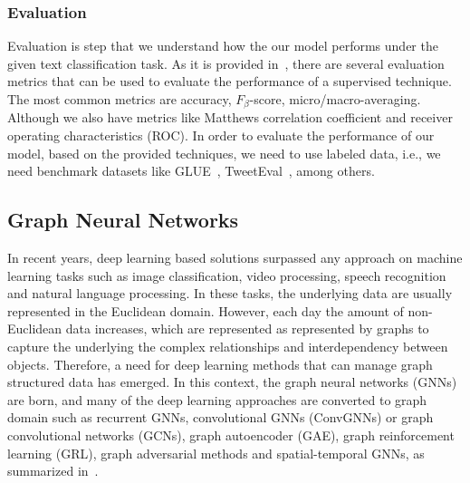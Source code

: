 \subsubsection{Evaluation}
Evaluation is step that we understand how the our model performs under the given text classification task. As it is provided in~\autocite{li20tc,minaee20tc}, there are several evaluation metrics that can be used to evaluate the performance of a supervised technique. The most common metrics are accuracy, \(F_\beta \)-score, micro/macro-averaging. Although we also have metrics like Matthews correlation coefficient and receiver operating characteristics (ROC). In order to evaluate the performance of our model, based on the provided techniques, we need to use labeled data, i.e., we need benchmark datasets like GLUE~\autocite{wang18glue}, TweetEval~\autocite{tweeteval}, among others.

\subsection{Graph Neural Networks}\label{sec:related:GNN}
In recent years, deep learning based solutions surpassed any approach on machine learning tasks such as image classification, video processing, speech recognition and natural language processing. In these tasks, the underlying data are usually represented in the Euclidean domain. However, each day the amount of non-Euclidean data increases, which are represented as represented by graphs to capture the underlying the complex relationships and interdependency between objects. Therefore, a need for deep learning methods that can manage graph structured data has emerged. In this context, the graph neural networks (GNNs) are born, and many of the deep learning approaches are converted to graph domain such as recurrent GNNs, convolutional GNNs (ConvGNNs) or graph convolutional networks (GCNs), graph autoencoder (GAE), graph reinforcement learning (GRL), graph adversarial methods and spatial-temporal GNNs, as summarized in~\autocite{zhou20gnn,wu21gnn,zhang18dlongraphs,sun18adversarial}.

